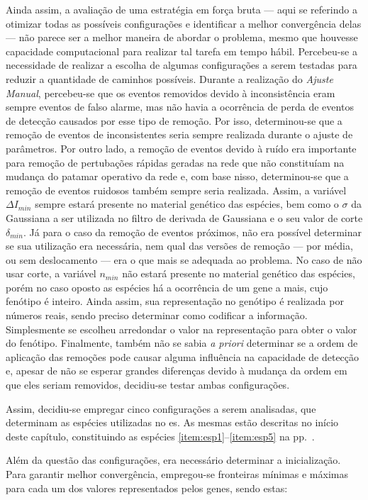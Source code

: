 Ainda assim, a avaliação de uma estratégia em força bruta --- aqui se
referindo a otimizar todas as possíveis configurações e identificar a
melhor convergência delas --- não parece ser a melhor maneira de
abordar o problema, mesmo que houvesse capacidade computacional para
realizar tal tarefa em tempo hábil. Percebeu-se a necessidade de
realizar a escolha de algumas configurações a serem testadas para
reduzir a quantidade de caminhos possíveis.
Durante a realização do \emph{Ajuste Manual}, percebeu-se que os
eventos removidos devido à inconsistência eram sempre eventos de falso
alarme, mas não havia a ocorrência de perda de eventos de detecção
causados por esse tipo de remoção. Por isso, determinou-se que a
remoção de eventos de inconsistentes seria sempre realizada durante o
ajuste de parâmetros. Por outro lado, a remoção de eventos devido à
ruído era importante para remoção de pertubações rápidas geradas na
rede que não constituíam na mudança do patamar operativo da rede e,
com base nisso, determinou-se que a remoção de eventos ruidosos também
sempre seria realizada. Assim, a variável $\Delta I_{min}$ sempre
estará presente no material genético das espécies, bem como o $\sigma$
da Gaussiana a ser utilizada no filtro de derivada de Gaussiana e o
seu valor de corte $\delta_{min}$. Já para o caso da remoção de
eventos próximos, não era possível determinar se sua utilização era
necessária, nem qual das versões de remoção --- por média, ou sem
deslocamento --- era o que mais se adequada ao problema. No caso de
não usar corte, a variável $n_{min}$ não estará presente no material
genético das espécies, porém no caso oposto as espécies há a
ocorrência de um gene a mais, cujo fenótipo é inteiro. Ainda assim,
sua representação no genótipo é realizada por números reais, sendo
preciso determinar como codificar a informação. Simplesmente se
escolheu arredondar o valor na representação para obter o valor do
fenótipo. Finalmente, também não se sabia \emph{a priori} determinar
se a ordem de aplicação das remoções pode causar alguma influência na
capacidade de detecção e, apesar de não se esperar grandes diferenças
devido à mudança da ordem em que eles seriam removidos, decidiu-se
testar ambas configurações.

Assim, decidiu-se empregar cinco configurações a serem analisadas, que
determinam as espécies utilizadas no \acs{es}. As mesmas estão
descritas no início deste capítulo, constituindo as espécies
\ref{item:esp1}--\ref{item:esp5} na pp.~\pageref{item:esp1}.

Além da questão das configurações, era necessário determinar a
inicialização. Para garantir melhor convergência, empregou-se
fronteiras mínimas e máximas para cada um dos valores representados
pelos genes, sendo estas:

